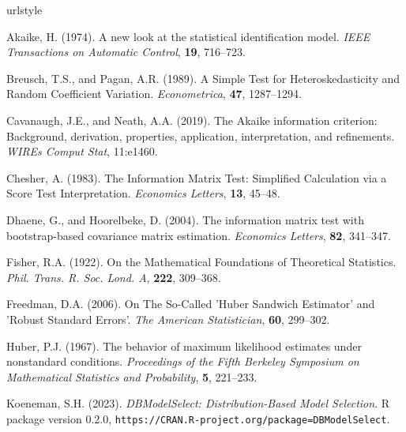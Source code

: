 \documentclass[review]{elsarticle}
\begin{document}
\begin{thebibliography}{99}
\providecommand{\natexlab}[1]{#1}
\providecommand{\url}[1]{\texttt{#1}}
\expandafter\ifx\csname urlstyle\endcsname\relax
  \providecommand{\doi}[1]{doi: #1}\else
  \providecommand{\doi}{doi: \begingroup \urlstyle{rm}\Url}\fi

{\rm Akaike, H.} (1974).
\newblock A new look at the statistical identification model.
\newblock \emph{IEEE Transactions on Automatic Control}, {\bf 19},  716--723.

{\rm Breusch, T.S., and Pagan, A.R.} (1989).
\newblock A Simple Test for Heteroskedasticity and Random Coefficient Variation.
\newblock \emph{Econometrica}, {\bf 47},  1287--1294.

{\rm Cavanaugh, J.E., and Neath, A.A.} (2019).
\newblock The Akaike information criterion: Background, derivation, properties, application, interpretation, and refinements.
\newblock \emph{WIREs Comput Stat}, 11:e1460.

{\rm Chesher, A.} (1983).
\newblock The Information Matrix Test: Simplified Calculation via a Score Test Interpretation.
\newblock \emph{Economics Letters}, {\bf 13},  45--48.

{\rm Dhaene, G., and Hoorelbeke, D.} (2004).
\newblock The information matrix test with bootstrap-based covariance matrix estimation.
\newblock \emph{Economics Letters}, {\bf 82},  341--347.

{\rm Fisher, R.A.} (1922).
\newblock On the Mathematical Foundations of Theoretical Statistics.
\newblock \emph{Phil. Trans. R. Soc. Lond. A}, {\bf 222},  309--368.

{\rm Freedman, D.A.} (2006).
\newblock On The So-Called 'Huber Sandwich Estimator' and 'Robust Standard Errors'.
\newblock \emph{The American Statistician}, {\bf 60},  299--302.

{\rm Huber, P.J.} (1967).
\newblock The behavior of maximum likelihood estimates under nonstandard conditions.
\newblock \emph{Proceedings of the Fifth Berkeley Symposium on Mathematical Statistics and Probability}, {\bf 5},  221--233.

{\rm Koeneman, S.H.} (2023).
\newblock \emph{DBModelSelect: Distribution-Based Model Selection}.
\newblock R package version 0.2.0, \url{https://CRAN.R-project.org/package=DBModelSelect}.


\end{thebibliography}
\end{document}
